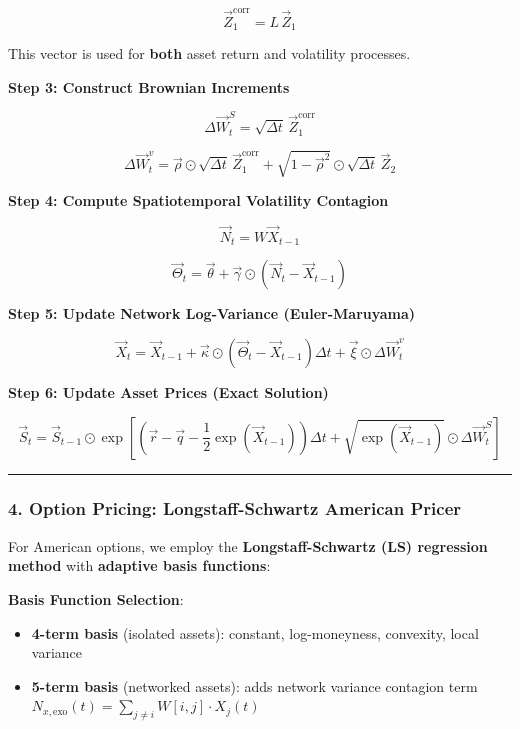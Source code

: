 \documentclass[
]{article}
\providecommand{\tightlist}{%
  \setlength{\itemsep}{0pt}\setlength{\parskip}{0pt}}
\begin{document}
\[\vec{Z}_1^{\text{corr}} = L \, \vec{Z}_1\]

This vector is used for \textbf{both} asset return and volatility
processes.

\textbf{Step 3: Construct Brownian Increments}

\[\Delta \vec{W}_t^S = \sqrt{\Delta t} \, \vec{Z}_1^{\text{corr}}\]

\[\Delta \vec{W}_t^v = \vec{\rho} \odot \sqrt{\Delta t} \, \vec{Z}_1^{\text{corr}} + \sqrt{1 - \vec{\rho}^2} \odot \sqrt{\Delta t} \, \vec{Z}_2\]

\textbf{Step 4: Compute Spatiotemporal Volatility Contagion}

\[\vec{N}_t = W\vec{X}_{t-1}\]

\[\vec{\Theta}_t = \vec{\theta} + \vec{\gamma} \odot (\vec{N}_t - \vec{X}_{t-1})\]

\textbf{Step 5: Update Network Log-Variance (Euler-Maruyama)}

\[\vec{X}_t = \vec{X}_{t-1} + \vec{\kappa} \odot \left( \vec{\Theta}_t - \vec{X}_{t-1} \right) \Delta t + \vec{\xi} \odot \Delta \vec{W}_t^v\]

\textbf{Step 6: Update Asset Prices (Exact Solution)}

\[\vec{S}_t = \vec{S}_{t-1} \odot \exp\left[ \left( \vec{r} - \vec{q} - \frac{1}{2}\exp(\vec{X}_{t-1}) \right) \Delta t + \sqrt{\exp(\vec{X}_{t-1})} \odot \Delta \vec{W}_t^S \right]\]

\begin{center}\rule{0.5\linewidth}{0.5pt}\end{center}

\subsubsection{4. Option Pricing: Longstaff-Schwartz American
Pricer}\label{option-pricing-longstaff-schwartz-american-pricer}

For American options, we employ the \textbf{Longstaff-Schwartz (LS)
regression method} with \textbf{adaptive basis functions}:

\textbf{Basis Function Selection}:

\begin{itemize}
\tightlist
\item
  \textbf{4-term basis} (isolated assets): constant, log-moneyness,
  convexity, local variance
\item
  \textbf{5-term basis} (networked assets): adds network variance
  contagion term
  \(N_{x,\text{exo}}(t) = \sum_{j \neq i} W[i,j] \cdot X_j(t)\)
\end{itemize}
\end{document}
